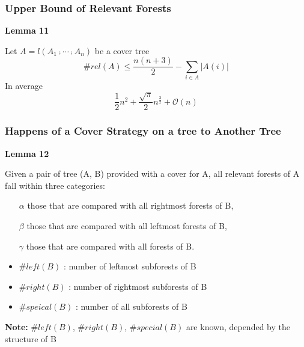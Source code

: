 \documentclass{beamer}
\begin{document}

\begin{frame}
\frametitle{Upper Bound of Relevant Forests}
\textbf{Lemma 11}

Let $A=l(A_1 \comp \cdots \comp A_n)$ be a cover tree 
\begin{displaymath}
\#rel(A) \leq \frac{n(n+3)}{2} - \sum_{i \in A} \left\vert A(i) \right\vert
\end{displaymath}
In average
\begin{displaymath}
\frac{1}{2}n^2 + \frac{\sqrt{\pi}}{2}n^{\frac{3}{2}} +\mathcal{O}(n)
\end{displaymath}

\end{frame}

\begin{frame}
\frametitle{Happens of a Cover Strategy on a tree to Another Tree}
\textbf{Lemma 12}

Given a pair of tree (A, B) provided with a cover for A, all relevant forests of A fall within three categories:

\begin{itemize}
\item[$\alpha$] those that are compared with all rightmost forests of B,
\item[$\beta$] those that are compared with all leftmost forests of B,
\item[$\gamma$] those that are compared with all forests of B.
\end{itemize}

\begin{itemize}
\item $\#left(B)$ : number of leftmost subforests of B 
\item $\#right(B)$ : number of rightmost subforests of B
\item $\#speical(B)$ : number of all subforests of B
\end{itemize}

\textbf{Note:} $\#left(B)$, $\#right(B)$, $\#special(B)$ are known, depended by the structure of B
\end{frame}
\end{document}
